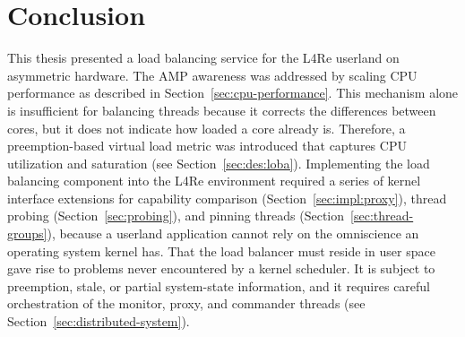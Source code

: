 \chapter{Conclusion}
\label{sec:conclusion}



This thesis presented a load balancing service for the L4Re userland on asymmetric hardware.
The AMP awareness was addressed by scaling CPU performance as described in Section~\ref{sec:cpu-performance}.
This mechanism alone is insufficient for balancing threads because it corrects the differences between cores, but it does not indicate how loaded a core already is.
Therefore, a preemption-based virtual load metric was introduced that captures CPU utilization and saturation (see Section~\ref{sec:des:loba}).
Implementing the load balancing component into the L4Re environment required a series of kernel interface extensions for capability comparison (Section~\ref{sec:impl:proxy}), thread probing (Section~\ref{sec:probing}), and pinning threads (Section~\ref{sec:thread-groups}), because a userland application cannot rely on the omniscience an operating system kernel has.
That the load balancer must reside in user space gave rise to problems never encountered by a kernel scheduler.
It is subject to preemption, stale, or partial system-state information, and it requires careful orchestration of the monitor, proxy, and commander threads (see Section~\ref{sec:distributed-system}).

